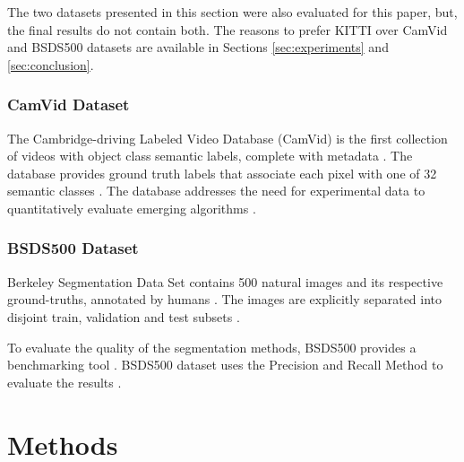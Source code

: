 \documentclass[10pt,twocolumn,letterpaper]{article}
\begin{document}
The two datasets presented in this section were also evaluated for this paper, but, the final results do not contain both. The reasons to prefer KITTI over CamVid and BSDS500 datasets are available in Sections \ref{sec:experiments} and \ref{sec:conclusion}.

\subsubsection{CamVid Dataset} \label{sssec:camvid_datasets}

The Cambridge-driving Labeled Video Database (CamVid) is the first collection of videos with object class semantic labels, complete with metadata \cite{CAMVID}. The database provides ground truth labels that associate each pixel with one of 32 semantic classes \cite{CAMVID}. The database addresses the need for experimental data to quantitatively evaluate emerging algorithms \cite{CAMVID}.

\subsubsection{BSDS500 Dataset} \label{sssec:bsds_dataset}

Berkeley Segmentation Data Set contains 500 natural images and its respective ground-truths, annotated by humans \cite{BSDS500}. The images are explicitly separated into disjoint train, validation and test subsets \cite{BSDS500}.

To evaluate the quality of the segmentation methods, BSDS500 provides a benchmarking tool \cite{BSDS500}. BSDS500 dataset uses the Precision and Recall Method to evaluate the results \cite{BSDS500}.


\section{Methods} \label{sec:methods}

\end{document}
